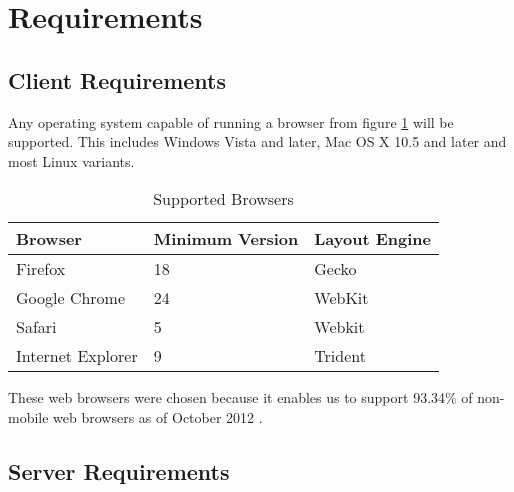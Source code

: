 \section{Requirements}

\subsection{Client Requirements}
Any operating system capable of running a browser from figure \ref{supportedBrowsers} will be supported. This includes Windows Vista and later, Mac OS X 10.5 and later and most Linux variants.
\begin{table}[ht]
	\centering
	\begin{tabular}{|l|l|l|}
		\hline
		\textbf{Browser} & \textbf{Minimum Version} & \textbf{Layout Engine} \\
		\hline
		Firefox & 18 & Gecko \\
		\hline
		Google Chrome & 24 & WebKit \\
		\hline
		Safari & 5 & Webkit \\
		\hline
		Internet Explorer & 9 & Trident \\
		\hline
	\end{tabular}
	\caption{Supported Browsers}
	\label{supportedBrowsers}
\end{table}

These web browsers were chosen because it enables us to support 93.34\% of non-mobile web browsers as of October 2012 \cite{usageShare}. 

\subsection{Server Requirements}

